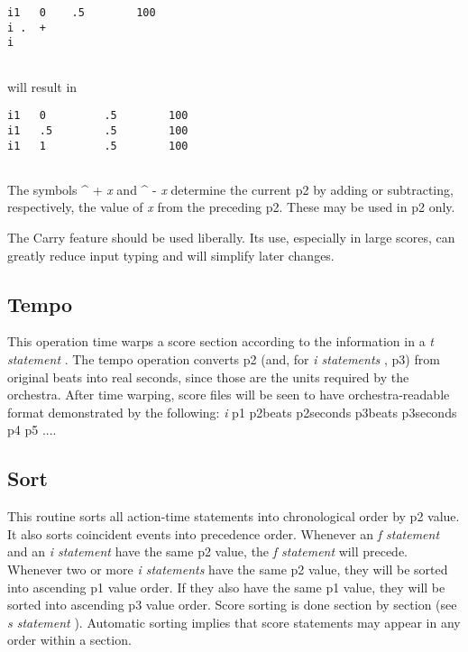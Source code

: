  
\begin{lstlisting}
i1   0    .5        100         
i .  +                   
i
        
\end{lstlisting}


 
 will result in 

 
\begin{lstlisting}
i1   0         .5        100
i1   .5        .5        100
i1   1         .5        100
        
\end{lstlisting}


 


  The symbols \^{} + \emph{x}
 and \^{} - \emph{x}
 determine the current p2 by adding or subtracting, respectively, the value of \emph{x}
 from the preceding p2. These may be used in p2 only. 


  The Carry feature should be used liberally. Its use, especially in large scores, can greatly reduce input typing and will simplify later changes. 
\subsection*{Tempo}


  This operation time warps a score section according to the information in a \emph{t statement}
. The tempo operation converts p2 (and, for \emph{i statements}
, p3) from original beats into real seconds, since those are the units required by the orchestra. After time warping, score files will be seen to have orchestra-readable format demonstrated by the following: \emph{i}
 p1 p2beats p2seconds p3beats p3seconds p4 p5 .... 
\subsection*{Sort}


  This routine sorts all action-time statements into chronological order by p2 value. It also sorts coincident events into precedence order. Whenever an \emph{f statement}
 and an \emph{i statement}
 have the same p2 value, the \emph{f statement}
 will precede. Whenever two or more \emph{i statements}
 have the same p2 value, they will be sorted into ascending p1 value order. If they also have the same p1 value, they will be sorted into ascending p3 value order. Score sorting is done section by section (see \emph{s statement}
). Automatic sorting implies that score statements may appear in any order within a section. 
